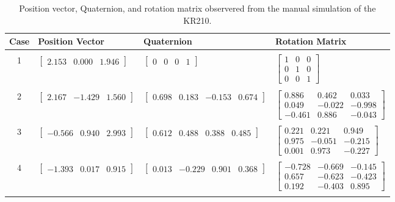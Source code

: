 \documentclass[a4paper]{article}
\begin{document}
\begin{table}[h]
	\centering
	\caption{Position vector, Quaternion, and rotation matrix observered from the manual simulation of the KR210.}
	\begin{tabular}{clll}
		\toprule
		\textbf{Case} & \textbf{Position Vector} & \textbf{Quaternion} & \textbf{Rotation Matrix}\\
		\midrule
		 & & & \\
		1 & $\begin{bmatrix}2.153 & 0.000 & 1.946\end{bmatrix}$ & $\begin{bmatrix}0 & 0 & 0 & 1\end{bmatrix}$ & $\begin{bmatrix}1 & 0 & 0 \\ 0 & 1 & 0 \\ 0 & 0 & 1\end{bmatrix}$\\
		 & & & \\
		2 & $\begin{bmatrix}2.167 & -1.429 & 1.560\end{bmatrix}$ & $\begin{bmatrix}0.698 & 0.183 & -0.153 & 0.674\end{bmatrix}$ & $\begin{bmatrix}0.886 & 0.462 & 0.033 \\ 0.049 & -0.022 & -0.998 \\ -0.461 & 0.886 & -0.043\end{bmatrix}$\\
		 & & & \\
		3 & $\begin{bmatrix}-0.566 & 0.940 & 2.993\end{bmatrix}$ & $\begin{bmatrix}0.612 & 0.488 & 0.388 & 0.485\end{bmatrix}$ & $\begin{bmatrix}0.221 & 0.221 & 0.949 \\ 0.975 & -0.051 & -0.215 \\ 0.001 & 0.973 & -0.227\end{bmatrix}$\\
		 & & & \\
		4 & $\begin{bmatrix}-1.393 & 0.017 & 0.915\end{bmatrix}$ & $\begin{bmatrix}0.013 & -0.229 & 0.901 & 0.368\end{bmatrix}$ & $\begin{bmatrix}-0.728 & -0.669 & -0.145 \\ 0.657 & -0.623 & -0.423 \\ 0.192 & -0.403 & 0.895\end{bmatrix}$\\
		 & & & \\
		\bottomrule
	\end{tabular}
\end{table}
\end{document}
